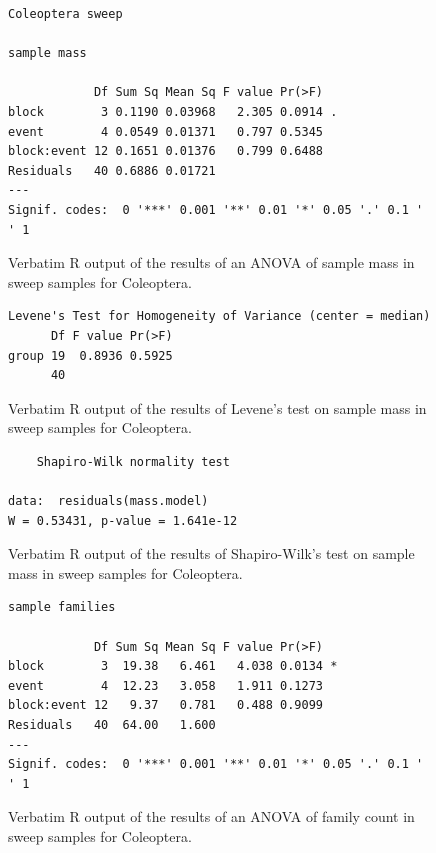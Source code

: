 \documentclass[10pt,letterpaper,twocolumn]{article}
\begin{document}
\begin{figure}[h]
	\lstset{numbers=left}
	\lstset{xleftmargin=5mm,framexleftmargin=5mm}
	\begin{lstlisting}
Coleoptera sweep 

sample mass 

            Df Sum Sq Mean Sq F value Pr(>F)  
block        3 0.1190 0.03968   2.305 0.0914 .
event        4 0.0549 0.01371   0.797 0.5345  
block:event 12 0.1651 0.01376   0.799 0.6488  
Residuals   40 0.6886 0.01721                 
---
Signif. codes:  0 '***' 0.001 '**' 0.01 '*' 0.05 '.' 0.1 ' ' 1
	\end{lstlisting}
	\caption{Verbatim R output of the results of an ANOVA of sample mass in sweep samples for Coleoptera.}
	\label{fig:sweep_coleoptera_mass_anova}
	\smallskip
	\nointerlineskip
	\hrulefill
\end{figure}

\begin{figure}[h]
	\lstset{numbers=left}
	\lstset{xleftmargin=5mm,framexleftmargin=5mm}
	\begin{lstlisting}
Levene's Test for Homogeneity of Variance (center = median)
      Df F value Pr(>F)
group 19  0.8936 0.5925
      40               
	\end{lstlisting}
	\caption{Verbatim R output of the results of Levene's test on sample mass in sweep samples for Coleoptera.}
	\label{fig:sweep_coleoptera_mass_levene}
	\smallskip
	\nointerlineskip
	\hrulefill
\end{figure}

\begin{figure}[h]
	\lstset{numbers=left}
	\lstset{xleftmargin=5mm,framexleftmargin=5mm}
	\begin{lstlisting}
	Shapiro-Wilk normality test

data:  residuals(mass.model)
W = 0.53431, p-value = 1.641e-12
	\end{lstlisting}
	\caption{Verbatim R output of the results of Shapiro-Wilk's test on sample mass in sweep samples for Coleoptera.}
	\label{fig:sweep_coleoptera_mass_shapiro}
	\smallskip
	\nointerlineskip
	\hrulefill
\end{figure}

\begin{figure}[h]
	\lstset{numbers=left}
	\lstset{xleftmargin=5mm,framexleftmargin=5mm}
	\begin{lstlisting}
sample families 

            Df Sum Sq Mean Sq F value Pr(>F)  
block        3  19.38   6.461   4.038 0.0134 *
event        4  12.23   3.058   1.911 0.1273  
block:event 12   9.37   0.781   0.488 0.9099  
Residuals   40  64.00   1.600                 
---
Signif. codes:  0 '***' 0.001 '**' 0.01 '*' 0.05 '.' 0.1 ' ' 1
	\end{lstlisting}
	\caption{Verbatim R output of the results of an ANOVA of family count in sweep samples for Coleoptera.}
	\label{fig:sweep_coleoptera_family_anova}
	\smallskip
	\nointerlineskip
	\hrulefill
\end{figure}
\end{document}
